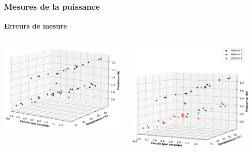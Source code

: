 \documentclass[a4paper,11pt]{beamer}
\begin{document}
\begin{frame}
    \frametitle{Mesures de la puissance}
    \framesubtitle{Erreurs de mesure}

    \begin{columns}
        \begin{column}{0.5\textwidth}
            \includegraphics[width=\textwidth]{tous_les_points.png}
        \end{column}
        \vline
        \begin{column}{0.5\textwidth}
            \includegraphics[width=\textwidth]{colorisee.png}
        \end{column}
    \end{columns}
\end{frame}
\end{document}
